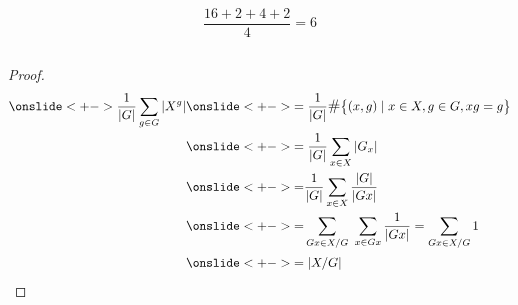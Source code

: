 \documentclass[standalone]{beamer}
\begin{document}
\begin{frame}
\begin{columns}
\begin{column}{0.4\textwidth}
      \[ \frac{16 + 2 + 4 + 2}{4} = 6 \]
    \end{column}
  \end{columns}
\end{frame}

\begin{frame}
  \begin{proof}
  \begin{align*}
    \onslide<+->{\frac{1}{\abs{G}} \sum_{g \in G} \abs{X^g}} &\onslide<+->{= \frac{1}{\abs{G}}
    \sharp \big\{ (x, g) \mid x \in X, g \in G, x g = g \big\}} \\
    & \onslide<+->{= \frac{1}{\abs{G}} \sum_{x \in X} \abs{G_x}} \\
    & \onslide<+->{{=} \frac{1}{\abs{G}} \sum_{x \in X} \frac{\abs{G}}{\abs{Gx}}}\\
    & \onslide<+->{{=} \sum_{Gx \in X / G} \ \sum_{x \in Gx} \frac{1}{\abs{Gx}} = \sum_{Gx \in X/G} 1 }\\
    & \onslide<+->{= \abs{X / G}}
  \end{align*}
  \end{proof}
\end{frame}
\end{document}

